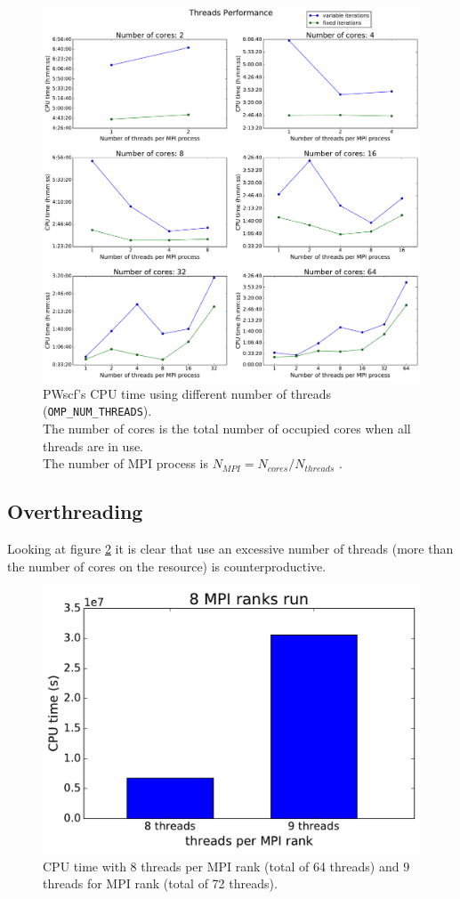 \documentclass[a4paper,12pt]{article}
\begin{document}
\begin{appendices}
\begin{figure}[hhh!]
	\centerline{\includegraphics[width=\linewidth]{A_threads.pdf}}
	\caption{ PWscf's CPU time using different number of threads (\texttt{OMP\_NUM\_THREADS}).
	\\The number of cores is the total number of occupied cores when all threads are in use.
	\\The number of MPI process is $ N_{MPI} = N_{cores} / N_{threads} $ .}
	\label{fig:A_threads}
\end{figure}

\newpage
\subsection{Overthreading}
Looking at figure \ref{fig:A_threadsOverload} it is clear that use an excessive number of threads (more than the number of cores on the resource) is counterproductive.
\begin{figure}[hhh!]
	\centerline{\includegraphics[width=0.5\linewidth]{threads_overload.pdf}}
	\caption{ CPU time with 8 threads per MPI rank (total of 64 threads) and 9 threads for MPI rank (total of 72 threads).}
	\label{fig:A_threadsOverload}
\end{figure}


\end{appendices}
\end{document}
